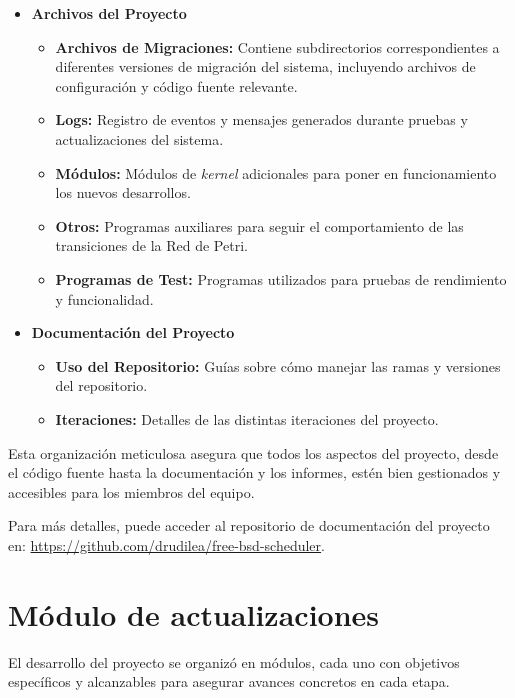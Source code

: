 \begin{itemize}
    \item \textbf{Archivos del Proyecto}
          \begin{itemize}
              \item \textbf{Archivos de Migraciones:} Contiene subdirectorios correspondientes a diferentes versiones de migración del sistema, incluyendo archivos de configuración y código fuente relevante.
              \item \textbf{Logs:} Registro de eventos y mensajes generados durante pruebas y actualizaciones del sistema.
              \item \textbf{Módulos:} Módulos de \textit{kernel} adicionales para poner en funcionamiento los nuevos desarrollos.
              \item \textbf{Otros:} Programas auxiliares para seguir el comportamiento de las transiciones de la Red de Petri.
              \item \textbf{Programas de Test:} Programas utilizados para pruebas de rendimiento y funcionalidad.
          \end{itemize}
    \item \textbf{Documentación del Proyecto}
          \begin{itemize}
              \item \textbf{Uso del Repositorio:} Guías sobre cómo manejar las ramas y versiones del repositorio.
              \item \textbf{Iteraciones:} Detalles de las distintas iteraciones del proyecto.
          \end{itemize}
\end{itemize}

Esta organización meticulosa asegura que todos los aspectos del proyecto, desde el código fuente hasta la documentación y los informes, estén bien gestionados y accesibles para los miembros del equipo.\par

Para más detalles, puede acceder al repositorio de documentación del proyecto en: \url{https://github.com/drudilea/free-bsd-scheduler}.\par

\section{Módulo de actualizaciones}

El desarrollo del proyecto se organizó en módulos, cada uno con objetivos específicos y alcanzables para asegurar avances concretos en cada etapa.\par

